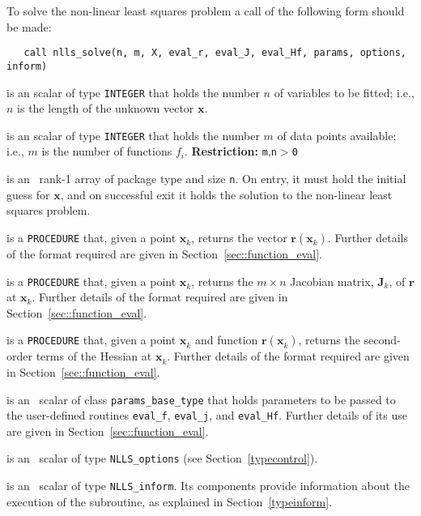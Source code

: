 \documentclass{spec}
\newcommand{\scalarintegerii}{is an \intentin scalar of type {\tt INTEGER} }
\newcommand{\vx}{ {\bm x} } %
\newcommand{\vr}{ {\bm r} } %
\newcommand{\vJ}{ {\bm J} } %
\newcommand{\iter}[2][k]{ #2_{#1}^{}} %
\begin{document}
To solve the non-linear least squares problem a call of the following form should be made:

\begin{verbatim}
   call nlls_solve(n, m, X, eval_r, eval_J, eval_Hf, params, options, inform)
\end{verbatim}

\begin{description}
 \scalarintegerii that holds the number $n$ of 
variables to be fitted; i.e., $n$ is the length of the unknown vector $\bm x$.

 \scalarintegerii that holds the number $m$ of 
data points available; i.e., $m$ is the number of functions $f_i$.
\textbf{Restriction:} \texttt{m},\texttt{n}$>$\texttt{0}

 is an \intentinout\  rank-1 array of package type 
and size {\tt n}.  On entry, it must hold the initial guess for $\bm x$, and on 
successful exit it holds the solution to the non-linear least squares problem.

 is a {\tt PROCEDURE} that, given a point $\iter{\vx}$, returns the vector $\vr(\iter{\vx})$.  
Further details of the format required are given in Section~\ref{sec::function_eval}.

 is a {\tt PROCEDURE} that, given a point $\iter{\vx}$, 
returns the $m \times n$ Jacobian matrix, $\iter{\vJ}$, of $\vr$ at $\iter{\vx}$.  
Further details of the format required are given in Section~\ref{sec::function_eval}.

 is a {\tt PROCEDURE} that, given a point $\iter{\vx}$
and function $\vr(\iter{\vx})$, returns the second-order terms of the Hessian at $\iter{\vx}$. 
Further details of the format required are given in Section~\ref{sec::function_eval}.

 is an \intentin\ scalar of class {\tt params\_base\_type} that holds parameters to 
be passed to the user-defined routines {\tt eval\_f}, {\tt eval\_j}, and {\tt eval\_Hf}. 
Further details of its use are given in Section~\ref{sec::function_eval}.

is an \intentin\  scalar  of type {\tt NLLS\_options}
(see Section~\ref{typecontrol}).

 is an \intentinout\ scalar of type 
{\tt NLLS\_inform}. Its components provide information about the execution
of the subroutine, as explained in Section~\ref{typeinform}.


\end{description}
\end{document}
